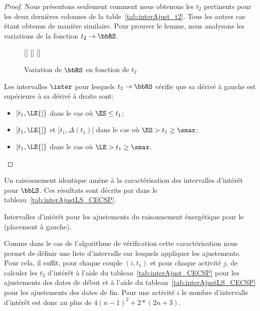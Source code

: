 \begin{proof}
  Nous présentons seulement comment nous obtenons les $t_2$ pertinents
pour les deux dernières colonnes de la
table~\ref{tab:interAjust_t2}. Tous les autres cas étant obtenus de
manière similaire. Pour prouver le lemme, nous analysons les
variations de la fonction $t_2 \rightarrow \bbRS$.


\begin{figure}[!htb]
 [\linewidth] {
    }
 [\linewidth]{
  }
 [\linewidth]
{}
\caption{Variation de $\bbRS$ en fonction de $t_2$}
\end{figure}


Les intervalles $\inter$ pour lesquels $t_2 \rightarrow \bbRS$ vérifie
que sa dérivé à gauche est supérieure à sa dérivé à droite sont:
\begin{itemize}
\item $[t_1, \LE {[}$ dans le cas où $\ES \le t_1 $;
\item $[t_1, \LE {[}$ et $[t_1, \Delta(t_1) [$ dans le cas où $\ES > t_1 \ge \smax$;
\item $[t_1, \LE {[}$ dans le cas où $\LE > t_1 \ge \smax $.
\end{itemize}

\end{proof}

Un raisonnement identique amène à la caractérisation des intervalles
d'intérêt pour $\bbLS$. Ces résultats sont décrits par dans le
tableau~\ref{tab:interAjustLS_CECSP}.
  \begin{table} 
  
  \caption{Intervalles d'intérêt pour les ajustements du
    raisonnement énergétique pour le \CECSP (placement à gauche).}
  \label{tab:interAjustLS_CECSP}
\end{table}

Comme dans le cas de l'algorithme de vérification cette
caractérisation nous permet de définir une liste d'intervalle sur
lesquels appliquer les ajustements. Pour cela, il suffit, pour chaque
couple $(i,t_1)$ et pour chaque activité $j$, de calculer les
$t_2$ d'intérêt à l'aide du tableau~\ref{tab:interAjust_CECSP} pour
les ajustements des dates de début et à l'aide du
tableau~\ref{tab:interAjustLS_CECSP} pour 
les ajustements des dates de fin. Pour une activité $i$ le nombre
d'intervalle d'intérêt est donc au plus de $4(n-1)^2 + 2* (2n+3)$.










